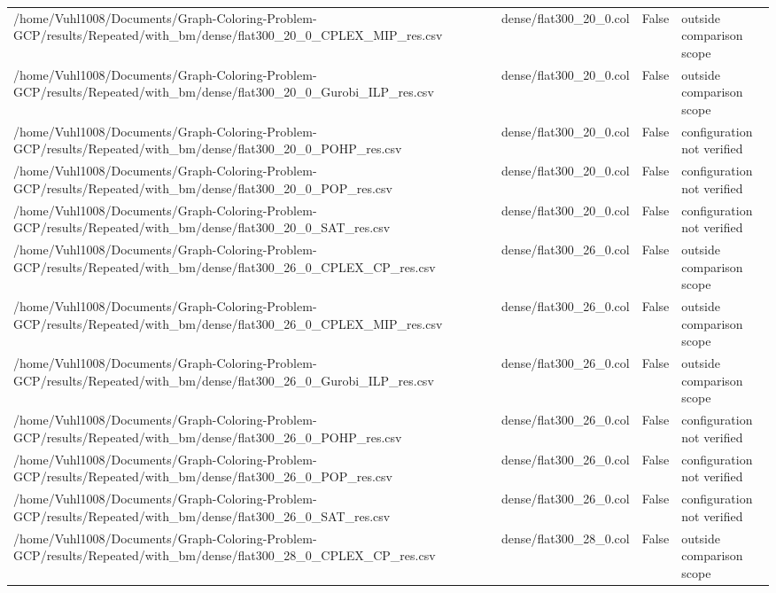 \begin{table}[htbp]
\begin{tabular}{llll}
/home/Vuhl1008/Documents/Graph-Coloring-Problem-GCP/results/Repeated/with\_bm/dense/flat300\_20\_0\_CPLEX\_MIP\_res.csv & dense/flat300\_20\_0.col & False & outside comparison scope \\
/home/Vuhl1008/Documents/Graph-Coloring-Problem-GCP/results/Repeated/with\_bm/dense/flat300\_20\_0\_Gurobi\_ILP\_res.csv & dense/flat300\_20\_0.col & False & outside comparison scope \\
/home/Vuhl1008/Documents/Graph-Coloring-Problem-GCP/results/Repeated/with\_bm/dense/flat300\_20\_0\_POHP\_res.csv & dense/flat300\_20\_0.col & False & configuration not verified \\
/home/Vuhl1008/Documents/Graph-Coloring-Problem-GCP/results/Repeated/with\_bm/dense/flat300\_20\_0\_POP\_res.csv & dense/flat300\_20\_0.col & False & configuration not verified \\
/home/Vuhl1008/Documents/Graph-Coloring-Problem-GCP/results/Repeated/with\_bm/dense/flat300\_20\_0\_SAT\_res.csv & dense/flat300\_20\_0.col & False & configuration not verified \\
/home/Vuhl1008/Documents/Graph-Coloring-Problem-GCP/results/Repeated/with\_bm/dense/flat300\_26\_0\_CPLEX\_CP\_res.csv & dense/flat300\_26\_0.col & False & outside comparison scope \\
/home/Vuhl1008/Documents/Graph-Coloring-Problem-GCP/results/Repeated/with\_bm/dense/flat300\_26\_0\_CPLEX\_MIP\_res.csv & dense/flat300\_26\_0.col & False & outside comparison scope \\
/home/Vuhl1008/Documents/Graph-Coloring-Problem-GCP/results/Repeated/with\_bm/dense/flat300\_26\_0\_Gurobi\_ILP\_res.csv & dense/flat300\_26\_0.col & False & outside comparison scope \\
/home/Vuhl1008/Documents/Graph-Coloring-Problem-GCP/results/Repeated/with\_bm/dense/flat300\_26\_0\_POHP\_res.csv & dense/flat300\_26\_0.col & False & configuration not verified \\
/home/Vuhl1008/Documents/Graph-Coloring-Problem-GCP/results/Repeated/with\_bm/dense/flat300\_26\_0\_POP\_res.csv & dense/flat300\_26\_0.col & False & configuration not verified \\
/home/Vuhl1008/Documents/Graph-Coloring-Problem-GCP/results/Repeated/with\_bm/dense/flat300\_26\_0\_SAT\_res.csv & dense/flat300\_26\_0.col & False & configuration not verified \\
/home/Vuhl1008/Documents/Graph-Coloring-Problem-GCP/results/Repeated/with\_bm/dense/flat300\_28\_0\_CPLEX\_CP\_res.csv & dense/flat300\_28\_0.col & False & outside comparison scope \\

\end{tabular}
\end{table}
